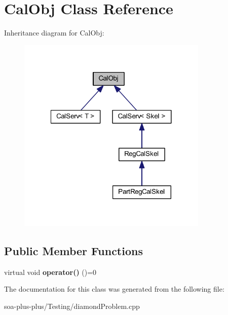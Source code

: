 \hypertarget{class_cal_obj}{
\section{CalObj Class Reference}
\label{class_cal_obj}
}


Inheritance diagram for CalObj:\nopagebreak
\begin{figure}[H]
\begin{center}
\leavevmode
\includegraphics[width=257pt]{class_cal_obj__inherit__graph}
\end{center}
\end{figure}
\subsection*{Public Member Functions}
\begin{DoxyCompactItemize}
\item 
\hypertarget{class_cal_obj_a5ac468d42ed8665a93c557cbf27f79e0}{
virtual void {\bfseries operator()} ()=0}
\label{class_cal_obj_a5ac468d42ed8665a93c557cbf27f79e0}

\end{DoxyCompactItemize}


The documentation for this class was generated from the following file:\begin{DoxyCompactItemize}
\item 
soa-\/plus-\/plus/Testing/diamondProblem.cpp\end{DoxyCompactItemize}

